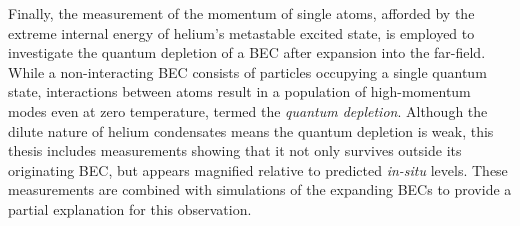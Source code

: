 Finally, the measurement of the momentum of single atoms, afforded by the extreme internal energy of helium's metastable excited state, is employed to investigate the quantum depletion of a BEC after expansion into the far-field.
While a non-interacting BEC consists of particles occupying a single quantum state, interactions between atoms result in a population of high-momentum modes even at zero temperature, termed the \emph{quantum depletion}.
Although the dilute nature of helium condensates means the quantum depletion is weak, this thesis includes measurements showing that it not only survives outside its originating BEC, but appears magnified relative to predicted \emph{in-situ} levels.
These measurements are combined with simulations of the expanding BECs to provide a partial explanation for this observation.










